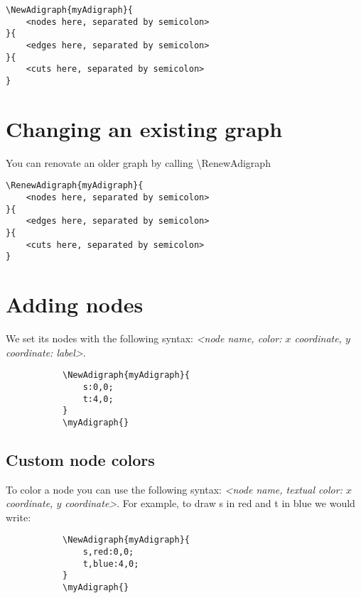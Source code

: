 \documentclass{report}
\begin{document}
\begin{verbatim}
\NewAdigraph{myAdigraph}{
	<nodes here, separated by semicolon>
}{
	<edges here, separated by semicolon>
}{
	<cuts here, separated by semicolon>
}
\end{verbatim}

\section{Changing an existing graph}
You can renovate an older graph by calling \textbackslash RenewAdigraph

\begin{verbatim}
\RenewAdigraph{myAdigraph}{
	<nodes here, separated by semicolon>
}{
	<edges here, separated by semicolon>
}{
	<cuts here, separated by semicolon>
}
\end{verbatim}

\section{Adding nodes}
We set its nodes with the following syntax: \textit{<node name, color: \(x\) coordinate, \(y\) coordinate: label>}.

\begin{figure}
	\begin{subfigure}{0.49\textwidth}
		\begin{verbatim}
\NewAdigraph{myAdigraph}{
 	s:0,0;
 	t:4,0;
}
\myAdigraph{}
\end{verbatim}
	\end{subfigure}
	\begin{subfigure}{0.49\textwidth}
		\myAdigraph{}
	\end{subfigure}
\end{figure}

\subsection{Custom node colors}
To color a node you can use the following syntax: \textit{<node name, textual color: \(x\) coordinate, \(y\) coordinate>}. For example, to draw s in red and t in blue we would write:

\begin{figure}
	\begin{subfigure}{0.49\textwidth}
		\begin{verbatim}
\NewAdigraph{myAdigraph}{
 	s,red:0,0;
 	t,blue:4,0;
}
\myAdigraph{}
\end{verbatim}
	\end{subfigure}
	\begin{subfigure}{0.49\textwidth}
		\myAdigraph{}
	\end{subfigure}
\end{figure}
\end{document}
